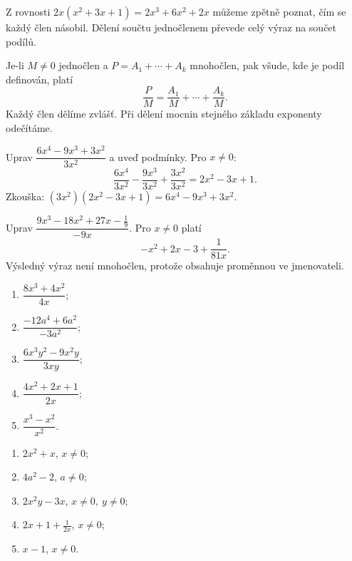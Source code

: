 \documentclass[11pt,a4paper]{article}
\begin{document}
Z rovnosti $2x(x^2+3x+1)=2x^3+6x^2+2x$ můžeme zpětně poznat, čím se každý člen násobil. Dělení součtu jednočlenem převede celý výraz na součet podílů.
\begin{zadaniBox}[title={Věta - Dělení mnohočlenu jednočlenem}]
Je-li $M\ne0$ jednočlen a $P=A_1+\cdots+A_k$ mnohočlen, pak všude, kde je podíl definován, platí
\[\frac{P}{M}=\frac{A_1}{M}+\cdots+\frac{A_k}{M}.\]
Každý člen dělíme zvlášť. Při dělení mocnin stejného základu exponenty odečítáme.
\end{zadaniBox}
\begin{prikladReseniBox}[breakable=false,title={Příklad 1}]
Uprav $\dfrac{6x^4-9x^3+3x^2}{3x^2}$ a uveď podmínky.
\tcblower
Pro $x\ne0$:
\[\frac{6x^4}{3x^2}-\frac{9x^3}{3x^2}+\frac{3x^2}{3x^2}=2x^2-3x+1.\]
Zkouška: $(3x^2)(2x^2-3x+1)=6x^4-9x^3+3x^2$.
\end{prikladReseniBox}
\begin{prikladReseniBox}[breakable=false,title={Příklad 2}]
Uprav $\dfrac{9x^3-18x^2+27x-\frac19}{-9x}$.
\tcblower
Pro $x\ne0$ platí
\[-x^2+2x-3+\frac{1}{81x}.\]
Výsledný výraz není mnohočlen, protože obsahuje proměnnou ve jmenovateli.
\end{prikladReseniBox}
\begin{zadaniReseniBox}[breakable=false,title={Samostatná práce 1}]
\begin{enumerate}[label=\alph*)]
\item $\dfrac{8x^3+4x^2}{4x}$;
\item $\dfrac{-12a^4+6a^2}{-3a^2}$;
\item $\dfrac{6x^3y^2-9x^2y}{3xy}$;
\item $\dfrac{4x^2+2x+1}{2x}$;
\item $\dfrac{x^3-x^2}{x^2}$.
\end{enumerate}
\tcblower
\begin{enumerate}[label=\alph*)]
\item $2x^2+x$, $x\ne0$;
\item $4a^2-2$, $a\ne0$;
\item $2x^2y-3x$, $x\ne0,\ y\ne0$;
\item $2x+1+\frac{1}{2x}$, $x\ne0$;
\item $x-1$, $x\ne0$.
\end{enumerate}
\end{zadaniReseniBox}
\end{document}
